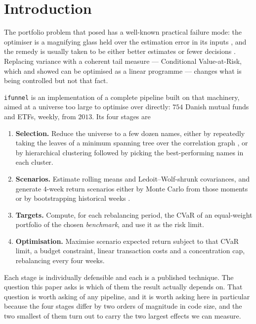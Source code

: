 \documentclass[11pt,a4paper]{article}
\newcommand{\code}[1]{\texttt{#1}}
\begin{document}
\section{Introduction}

The portfolio problem that \citet{markowitz1952} posed has a well-known
practical failure mode: the optimiser is a magnifying glass held over the
estimation error in its inputs \citep{michaud1989,best1991}, and the remedy is
usually taken to be either better estimates \citep{ledoit2004,jorion1986} or
fewer decisions \citep{demiguel2009}. Replacing variance with a coherent tail
measure \citep{artzner1999} --- Conditional Value-at-Risk, which
\citet{rockafellar2000} and \citet{krokhmal2002} showed can be optimised as a
linear programme --- changes what is being controlled but not that fact.

\code{ifunnel} is an implementation of a complete pipeline built on that
machinery, aimed at a universe too large to optimise over directly: $754$
Danish mutual funds and ETFs, weekly, from $2013$. Its four stages are

\begin{enumerate}
  \item \textbf{Selection.} Reduce the universe to a few dozen names, either by
        repeatedly taking the leaves of a minimum spanning tree over the
        correlation graph \citep{mantegna1999,onnela2003}, or by hierarchical
        clustering followed by picking the best-performing names in each
        cluster.
  \item \textbf{Scenarios.} Estimate rolling means and Ledoit--Wolf-shrunk
        covariances, and generate $4$-week return scenarios either by Monte
        Carlo from those moments or by bootstrapping historical weeks
        \citep{efron1979}.
  \item \textbf{Targets.} Compute, for each rebalancing period, the CVaR of an
        equal-weight portfolio of the chosen \emph{benchmark}, and use it as
        the risk limit.
  \item \textbf{Optimisation.} Maximise scenario expected return subject to
        that CVaR limit, a budget constraint, linear transaction costs and a
        concentration cap, rebalancing every four weeks.
\end{enumerate}

Each stage is individually defensible and each is a published technique. The
question this paper asks is which of them the result actually depends on. That
question is worth asking of any pipeline, and it is worth asking here in
particular because the four stages differ by two orders of magnitude in code
size, and the two smallest of them turn out to carry the two largest effects we
can measure.
\end{document}
